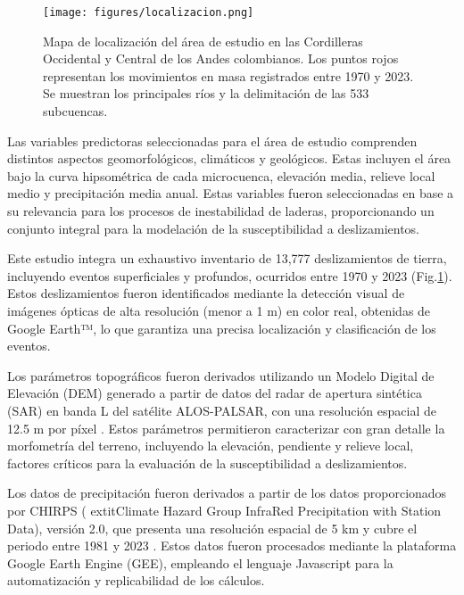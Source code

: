 \documentclass[
  manuscript=article,  
  layout=preprint,  
]{format}
\begin{document}
\begin{figure}[ht!]
    \centering
      {\texttt{[image: figures/localizacion.png]}}
\caption{Mapa de localización del área de estudio en las Cordilleras Occidental y Central de los Andes colombianos. Los puntos rojos representan los movimientos en masa registrados entre 1970 y 2023. Se muestran los principales ríos y la delimitación de las 533 subcuencas. }
    \label{fig:localizacion}
\end{figure}

\par Las variables predictoras seleccionadas para el área de estudio comprenden distintos aspectos geomorfológicos, climáticos y geológicos. Estas incluyen el área bajo la curva hipsométrica de cada microcuenca, elevación media, relieve local medio y precipitación media anual. Estas variables fueron seleccionadas en base a su relevancia para los procesos de inestabilidad de laderas, proporcionando un conjunto integral para la modelación de la susceptibilidad a deslizamientos.

\par Este estudio integra un exhaustivo inventario de 13,777 deslizamientos de tierra, incluyendo eventos superficiales y profundos, ocurridos entre 1970 y 2023 (Fig.\ref{fig:localizacion}). Estos deslizamientos fueron identificados mediante la detección visual de imágenes ópticas de alta resolución (menor a 1 m) en color real, obtenidas de Google Earth™, lo que garantiza una precisa localización y clasificación de los eventos.

\par Los parámetros topográficos fueron derivados utilizando un Modelo Digital de Elevación (DEM) generado a partir de datos del radar de apertura sintética (SAR) en banda L del satélite ALOS-PALSAR, con una resolución espacial de 12.5 m por píxel \cite{logan2014}. Estos parámetros permitieron caracterizar con gran detalle la morfometría del terreno, incluyendo la elevación, pendiente y relieve local, factores críticos para la evaluación de la susceptibilidad a deslizamientos.

\par Los datos de precipitación fueron derivados a partir de los datos proporcionados por CHIRPS (	extit{Climate Hazard Group InfraRed Precipitation with Station Data}), versión 2.0, que presenta una resolución espacial de 5 km y cubre el periodo entre 1981 y 2023 \cite{funk2015}. Estos datos fueron procesados mediante la plataforma Google Earth Engine (GEE), empleando el lenguaje Javascript para la automatización y replicabilidad de los cálculos.
\end{document}

